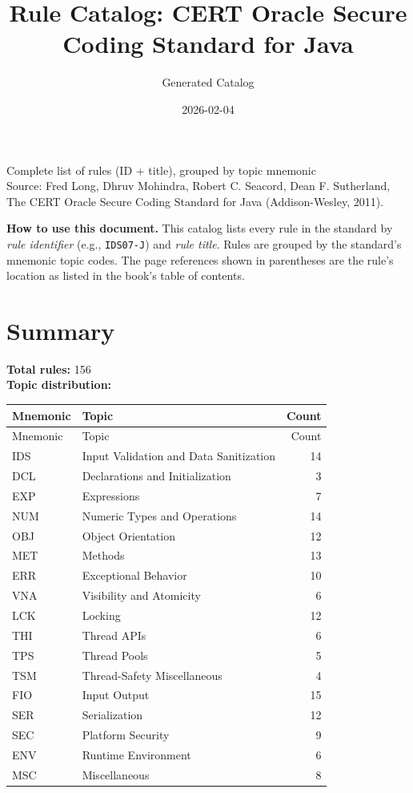 \documentclass[11pt]{report}
\title{Rule Catalog: CERT Oracle Secure Coding Standard for Java}
\author{Generated Catalog}
\date{2026-02-04}
\begin{document}
\hypersetup{pageanchor=false}
\maketitle
\hypersetup{pageanchor=true}
\thispagestyle{empty}
\begin{center}
\large Complete list of rules (ID + title), grouped by topic mnemonic\\[6pt]
\normalsize Source: Fred Long, Dhruv Mohindra, Robert C. Seacord, Dean F. Sutherland, The CERT\textregistered{} Oracle\textregistered{} Secure Coding Standard for Java\texttrademark{} (Addison-Wesley, 2011).\\
\end{center}
\vspace{12pt}
\noindent\textbf{How to use this document.} This catalog lists every rule in the standard by \emph{rule identifier} (e.g., \texttt{IDS07-J}) and \emph{rule title}. Rules are grouped by the standard's mnemonic topic codes. The page references shown in parentheses are the rule's location as listed in the book's table of contents.
\tableofcontents
\clearpage
\chapter*{Summary}
\noindent\textbf{Total rules:} 156\\
\noindent\textbf{Topic distribution:}
\begin{longtable}{@{}llr@{}}
\toprule
Mnemonic & Topic & Count\\
\midrule
\endfirsthead
\toprule
Mnemonic & Topic & Count\\
\midrule
\endhead
\bottomrule
\endfoot
IDS & Input Validation and Data Sanitization & 14\\
DCL & Declarations and Initialization & 3\\
EXP & Expressions & 7\\
NUM & Numeric Types and Operations & 14\\
OBJ & Object Orientation & 12\\
MET & Methods & 13\\
ERR & Exceptional Behavior & 10\\
VNA & Visibility and Atomicity & 6\\
LCK & Locking & 12\\
THI & Thread APIs & 6\\
TPS & Thread Pools & 5\\
TSM & Thread-Safety Miscellaneous & 4\\
FIO & Input Output & 15\\
SER & Serialization & 12\\
SEC & Platform Security & 9\\
ENV & Runtime Environment & 6\\
MSC & Miscellaneous & 8\\
\end{longtable}
\clearpage
\end{document}

